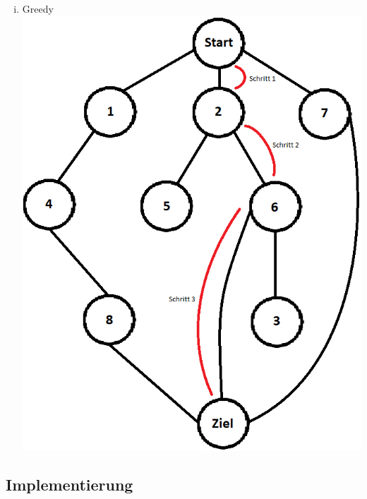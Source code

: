 \documentclass[fleqn]{scrartcl}
\begin{document}
\begin{enumerate}[a)]
\begin{enumerate}[i.]
\item Greedy\\
\includegraphics[width=\linewidth]{pictures/greedy-search.png}
\end{enumerate}
\end{enumerate}

\subsection{Implementierung}




\end{document}
